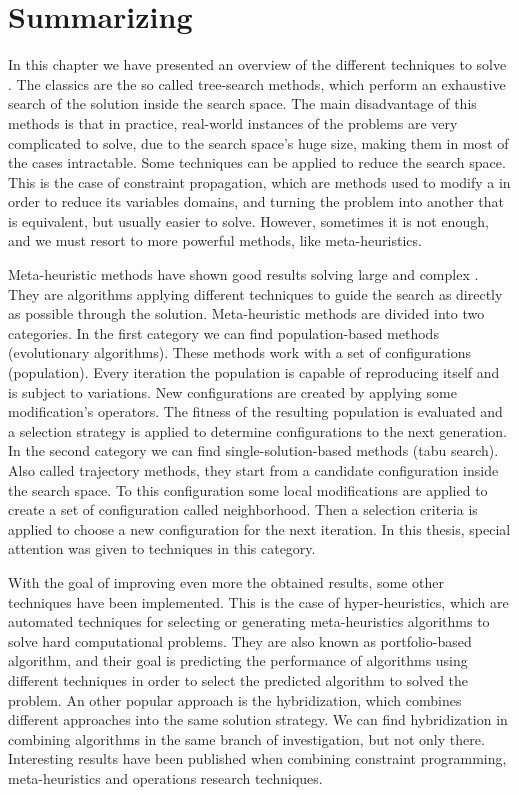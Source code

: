 \section{Summarizing}

In this chapter we have presented an overview of the different techniques to solve \CSPs{}. %
The classics are the so called tree-search methods, which perform an exhaustive search of the solution inside the search space. The main disadvantage of this methods is that in practice, real-world instances of the problems are very complicated to solve, due to the search space's huge size, making them in most of the cases intractable. Some techniques can be applied to reduce the search space. This is the case of constraint propagation, which are methods used to modify a \csp{} in order to reduce its variables domains, and turning the problem into another that is equivalent, but usually easier to solve. However, sometimes it is not enough, and we must resort %
to more powerful methods, like meta-heuristics. 

Meta-heuristic methods have shown good results solving large and complex \csps. They are algorithms applying different techniques to guide the search as directly as possible through the solution. Meta-heuristic methods are divided into two categories. In the first category we can find population-based methods (\eg evolutionary algorithms). These methods work with a set of configurations (population). Every iteration the population is capable of reproducing itself and is subject to variations. New configurations are created by applying some modification's operators. The fitness of the resulting population is evaluated and a selection strategy is applied to determine configurations to the next generation. In the second category we can find single-solution-based methods (\eg tabu search). Also called trajectory methods, they start from a candidate configuration inside the search space. To this configuration some local modifications are applied to create a set of configuration called neighborhood. Then a selection criteria is applied to choose a new configuration for the next iteration. In this thesis, special attention was given to techniques in this category.

With the goal of improving even more the obtained results, some other techniques have been implemented. This is the case of hyper-heuristics, which are automated techniques for selecting or generating meta-heuristics algorithms to solve hard computational problems. They are also known as portfolio-based algorithm, and their goal is predicting the performance of algorithms using different techniques in order to select the predicted algorithm to solved the problem. An other popular approach is the hybridization, which combines different approaches into the same solution strategy. We can find hybridization in combining algorithms in the same branch of investigation, but not only there. Interesting results have been published when combining constraint programming, meta-heuristics and operations research techniques.

